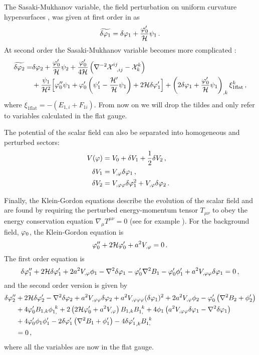The Sasaki-Mukhanov variable, \iec the field perturbation on uniform curvature
hypersurfaces \cite{Sasaki:1986hm,Mukhanov:1988jd}, was given at first order in
 as
%  
\begin{equation}
\label{eq:Q1I-num}
\widetilde{\delta\varphi_{1}}=\delta\varphi_{1}+\frac{\varphi_{0}'}{\mathcal{H}}\psi_1\,.
\end{equation}
% 
% 
At second order the Sasaki-Mukhanov variable becomes more complicated
\cite{Malik:2005cy,Malik:2003mv}:
% 
\begin{align}
\label{eq:Q2I-num}
% 
\wt{\dvp2} = &\dvp2
+\frac{\vp_0'}{\H}\psi_2
+\frac{\vp_0'}{4\H}\left(
\nabla^{-2}\X^{ij}_{~~,ij}-\X^k_{k}\right) \nonumber\\
&+\frac{\psi_1}{\H^2}\Big[\vp_0'' {\psi_1}
+\vp_0'\left(\psi_1'-\frac{\H'}{\H}\psi_1\right)+2\H\delta\vp_1'\Big]
+\left(2\dvp1+\frac{\vp_0'}{\H}\psi_1\right)_{,k}\xi_{1\mathrm{flat}}^k \,,
\end{align}
% 
where $\xi_{1\mathrm{flat}} = -(E_{1,i} +F_{1i})$. From now on we will
drop the tildes and only refer to variables calculated in the flat gauge.


The potential of the scalar field can also be separated into homogeneous and
perturbed sectors:
% 
\begin{align}
 V(\varphi) &= V_{0} + \delta V_{1} + \frac{1}{2}\delta V _{2}\,,\quad \\
 \delta V_{1} &= V_{,\varphi} \delta\varphi_{1} \,,\quad \\
 \delta V_{2} &= V_{,\varphi\varphi} \delta\varphi_{1}^2 + V_{,\varphi}\delta\varphi_{2} \,.
\end{align}
% 


Finally, the Klein-Gordon equations describe the evolution of the scalar field and
are
found by requiring the perturbed energy-momentum tensor $T_{\mu\nu}$ to obey the
energy conservation equation $\nabla_\mu T^{\mu\nu}=0$ (see for example
). For the
background field, $\varphi_0$, the Klein-Gordon equation is 
%
\begin{equation}
\label{eq:KGback-num}
\varphi_{0}''+2\mathcal{H}\varphi_{0}'+a^2 V_{,\varphi} = 0\,.   
\end{equation}
%
% 
% 
The first order equation is
%
\begin{equation}
\label{eq:KGflatsingle-num}
\delta\varphi_{1}''+2\mathcal{H}\delta\varphi_{1}'+2a^2 V_{,\varphi} \phi_1
-\nabla^2\delta\varphi_{1}-\varphi_{0}'\nabla^2 B_1
-\varphi_{0}'\phi'_1 + a^2 V_{,\varphi\varphi} \delta\varphi_{1}
=0\,,
\end{equation}
%
and the second order version is given by
%
\begin{align}
\label{eq:KG2flatsingle-num}
\dvp2'' &+ 2\H\dvp2'-\nabla^2\dvp2+a^2 \Upp \dvp2
+ a^2 \Uppp (\dvp1)^2 +2a^2 \Uphi \phi_2
-\vp_{0}'\left(\nabla^2 B_2+\phi_2'\right)\nonumber\\
%
&+ 4\vp_{0}' B_{1,k}\phi_{1,}^{~k}
+2\left(2\H\vp_{0}'+a^2 \Uphi\right) B_{1,k}B_{1,}^{~k}
+4\phi_1\left(a^2 \Upp \dvp1-\nabla^2\dvp1\right) \nonumber\\
&+ 4\vp_{0}'\phi_1\phi_1'
-2\dvp1'\left(\nabla^2 B_1+\phi_1'\right)-4{\dvp1'}_{,k}B_{1,}^{~k} \nonumber \\
&= 0\,,
\end{align}
% 
where all the variables are now in the flat gauge.


